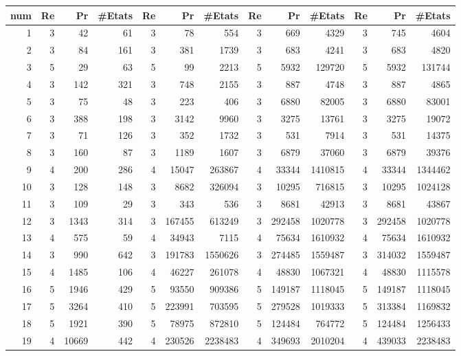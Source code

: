 \begin{table}[H]
\begin{tabular}{|r|rrr|rrr|rrr|rrr|}
		\rowcolor{cyan}	\textbf{num} & \textbf{Re} & \textbf{Pr} & \textbf{\#Etats} & \textbf{Re} & \textbf{Pr} & \textbf{\#Etats} & \textbf{Re} & \textbf{Pr} & \textbf{\#Etats} &\textbf{Re} & \textbf{Pr} & \textbf{\#Etats} \\ \hline
		\midrule
	1	&	3	&	42	&	61	&	3	&	78	&	554	&	3	&	669	&	4329	&	3	&	745	&	4604	\\ \hline
	2	&	3	&	84	&	161	&	3	&	381	&	1739	&	3	&	683	&	4241	&	3	&	683	&	4820	\\ \hline
	3	&	5	&	29	&	63	&	5	&	99	&	2213	&	5	&	5932	&	129720	&	5	&	5932	&	131744	\\ \hline
	4	&	3	&	142	&	321	&	3	&	748	&	2155	&	3	&	887	&	4748	&	3	&	887	&	4865	\\ \hline
	5	&	3	&	75	&	48	&	3	&	223	&	406	&	3	&	6880	&	82005	&	3	&	6880	&	83001	\\ \hline
	6	&	3	&	388	&	198	&	3	&	3142	&	9960	&	3	&	3275	&	13761	&	3	&	3275	&	19072	\\ \hline
	7	&	3	&	71	&	126	&	3	&	352	&	1732	&	3	&	531	&	7914	&	3	&	531	&	14375	\\ \hline
	8	&	3	&	160	&	87	&	3	&	1189	&	1607	&	3	&	6879	&	37060	&	3	&	6879	&	39376	\\ \hline
	9	&	4	&	200	&	286	&	4	&	15047	&	263867	&	4	&	33344	&	1410815	&	4	&	33344	&	1344462	\\ \hline
	10	&	3	&	128	&	148	&	3	&	8682	&	326094	&	3	&	10295	&	716815	&	3	&	10295	&	1024128	\\ \hline
	11	&	3	&	109	&	29	&	3	&	343	&	536	&	3	&	8681	&	42913	&	3	&	8681	&	43867	\\ \hline
	12	&	3	&	1343	&	314	&	3	&	167455	&	613249	&	3	&	292458	&	1020778	&	3	&	292458	&	1020778	\\ \hline
	13	&	4	&	575	&	59	&	4	&	34943	&	7115	&	4	&	75634	&	1610932	&	4	&	75634	&	1610932	\\ \hline
	14	&	3	&	990	&	642	&	3	&	191783	&	1550626	&	3	&	274485	&	1559487	&	3	&	314032	&	1559487	\\ \hline
	15	&	4	&	1485	&	106	&	4	&	46227	&	261078	&	4	&	48830	&	1067321	&	4	&	48830	&	1115578	\\ \hline
	16	&	5	&	1946	&	429	&	5	&	93550	&	909386	&	5	&	149187	&	1118045	&	5	&	149187	&	1118045	\\ \hline
	17	&	5	&	3264	&	410	&	5	&	223991	&	703595	&	5	&	279528	&	1019333	&	5	&	313384	&	1169832	\\ \hline
	18	&	5	&	1921	&	390	&	5	&	78975	&	872810	&	5	&	124484	&	764772	&	5	&	124484	&	1256433	\\ \hline
	19	&	4	&	10669	&	442	&	4	&	230526	&	2238483	&	4	&	349693	&	2010204	&	4	&	439033	&	2238483	\\ \hline

\end{tabular}
\end{table}
